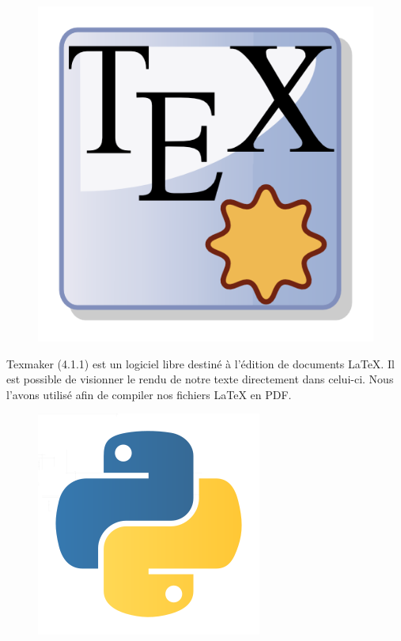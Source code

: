 \documentclass[17pts]{report}
\begin{document}
\begin{figure}[H]
    \includegraphics[scale=1.1]{illustrations/texmaker.png}
    \centering
\end{figure}

Texmaker (4.1.1) est un logiciel libre destiné à l'édition de documents LaTeX.
Il est possible de visionner le rendu de notre texte directement dans celui-ci.
Nous l'avons utilisé afin de compiler nos fichiers LaTeX en PDF.\\

\begin{figure}[H]
    \includegraphics[scale=0.2]{illustrations/python.png}
    \centering
\end{figure}
\end{document}
